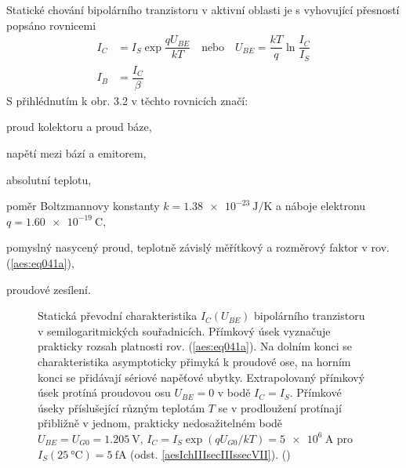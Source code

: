       Statické chování bipolárního tranzistoru v aktivní oblasti je s vyhovující přesností popsáno
      rovnicemi
      \begin{subequations}\label{aes:eq041}
        \begin{align}
          I_C    &= I_S\exp\dfrac{qU_{BE}}{kT} \quad\text{nebo}\quad      
          U_{BE}  = \dfrac{kT}{q}\ln\dfrac{I_C}{I_S}                      \label{aes:eq041a}   \\
          I_B    &= \dfrac{I_C}{\beta}                                    \label{aes:eq041b} 
        \end{align}
      \end{subequations}
      S přihlédnutím k obr. 3.2 v těchto rovnicích značí:
      \begin{description}[leftmargin=5em,labelindent=2em, style=nextline]
        \item [\(I_C\), \(I_B\)] proud kolektoru a  proud báze, 
        \item [\(U_{BE}\)] napětí mezi bází a emitorem,
        \item [\(T\)] absolutní teplotu, 
        \item [\(k/q = \qty{86.2}{\micro\volt\per\kelvin}\)] poměr Boltzmannovy konstanty
              \(k = \qty{1.38e-23}{\joule\per\kelvin}\) a náboje elektronu \(q =
              \qty{1.60e-19}{\coulomb}\), 
        \item [\(I_S\)] pomyslný nasycený proud, teplotně závislý měřítkový a rozměrový faktor v
              rov. (\ref{aes:eq041a}),
        \item [\(\beta\)]  proudové zesílení.
      \end{description}

      \begin{figure}[ht!] %
        \centering
        \caption{ Statická převodní charakteristika \(I_C(U_{BE})\) bipolárního tranzistoru v
                  semilogaritmických souřadnicích. Přímkový úsek vyznačuje prakticky rozsah
                  platnosti rov. (\ref{aes:eq041a}). Na dolním konci se charakteristika asymptoticky
                  přimyká k proudové ose, na horním konci se přidávají sériové napěťové ubytky.
                  Extrapolovaný přímkový úsek protíná proudovou osu \(U_{BE} = 0\) v bodě \(I_C =
                  I_S\). Přímkové úseky příslušející různým teplotám \(T\) se v prodloužení
                  protínají přibližně v jednom, prakticky nedosažitelném bodě \(U_{BE} = U_{G0} =
                  \qty{1.205}{\V}\), \(I_C = I_S\exp(qU_{G0}/kT) = \qty{5e6}{\A}\) pro
                  \(I_S(\qty{25}{\degreeCelsius}) = \qty{5}{\femto\A}\) (odst.
                  \ref{aesIchIIIsecIIIssecVII}). (\cite[s.~38]{Dostal})}
        \label{aes:fig061}
      \end{figure}
      
